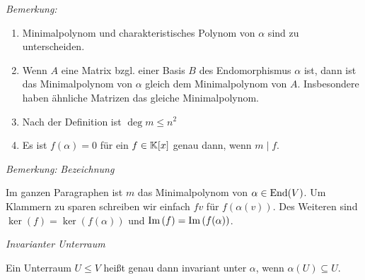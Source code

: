 
\textit{Bemerkung:}
\begin{enumerate}
    \item Minimalpolynom und charakteristisches Polynom von $\alpha$ sind zu unterscheiden.
    \item Wenn $A$ eine Matrix bzgl. einer Basis $B$ des Endomorphismus $\alpha$ ist, dann ist das Minimalpolynom von $\alpha$ gleich dem Minimalpolynom von $A$.
        Insbesondere haben ähnliche Matrizen das gleiche Minimalpolynom.
    \item Nach der Definition ist $\deg m \leq n^2$
    \item Es ist $f(\alpha) = 0$ für ein $f \in \mathbb{K}[x]$ genau dann, wenn $m \mid f$.
\end{enumerate}


\textit{Bemerkung: }\textit{Bezeichnung}

Im ganzen Paragraphen ist $m$ das Minimalpolynom von $\alpha \in \text{End}(V)$.
Um Klammern zu sparen schreiben wir einfach $fv$ für $f(\alpha(v))$.
Des Weiteren sind $\ker (f) = \ker (f(\alpha))$ und $\text{Im}\, (f)=\text{Im}\, (f(\alpha))$.


\begin{mydef}\textit{Invarianter Unterraum}

    Ein Unterraum $U \leq V$ heißt genau dann invariant unter $\alpha$, wenn $\alpha(U)\subseteq U$.
\end{mydef}


